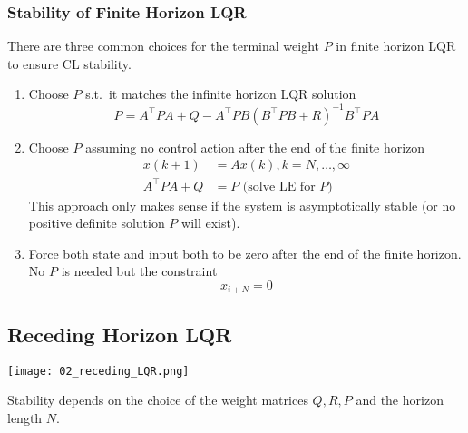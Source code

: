 \subsubsection{Stability of Finite Horizon LQR}

There are three common choices for the terminal weight $P$ in finite horizon LQR to ensure CL stability.
\begin{enumerate}
    \item Choose $P$ s.t.\ it matches the infinite horizon LQR solution
          \begin{equation*}
              P=A^\top PA+Q-A^\top PB{(B^\top PB+R)}^{-1}B^\top PA
          \end{equation*}
    \item Choose $P$ assuming no control action after the end of the finite horizon
          \begin{align*}
              x(k+1)        & =Ax(k),k=N,\dots ,\infty      \\
              A^{\top}PA +Q & = P\text{ (solve LE for $P$)}
          \end{align*}
          This approach only makes sense if the system is asymptotically stable (or no positive definite solution $P$ will exist).
    \item Force both state and input both to be zero after the end of the finite horizon. No $P$ is needed but the constraint
          \begin{equation*}
              x_{i+N} = 0
          \end{equation*}
\end{enumerate}

\subsection{Receding Horizon LQR}


\begin{center}
    \texttt{[image: 02\_receding\_LQR.png]}
\end{center}

\newpar{}

Stability depends on the choice of the weight matrices $Q, R, P$ and the horizon length $N$.

